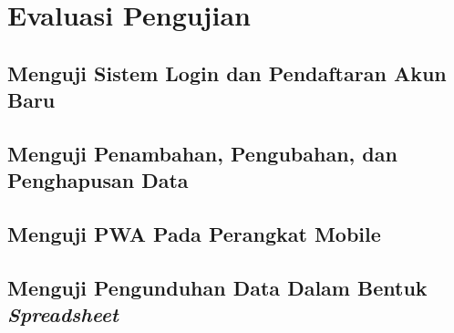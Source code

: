 \section{Evaluasi Pengujian}
\vspace{1ex}

\subsection{Menguji Sistem Login dan Pendaftaran Akun Baru}
\vspace{1ex}

\lipsum[4]
\vspace{0.5ex}

\subsection{Menguji Penambahan, Pengubahan, dan Penghapusan Data}
\vspace{1ex}

\lipsum[4]
\vspace{0.5ex}

\subsection{Menguji PWA Pada Perangkat Mobile}
\vspace{1ex}

\lipsum[4]
\vspace{0.5ex}

\subsection{Menguji Pengunduhan Data Dalam Bentuk \emph{Spreadsheet}}
\vspace{1ex}

\lipsum[4]
\vspace{0.5ex}